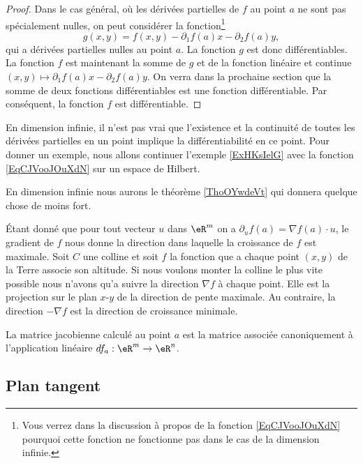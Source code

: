 \begin{proof}
Dans le cas général, où les dérivées partielles de $f$ au point $a$ ne sont pas spécialement nulles, on peut considérer la fonction\footnote{Vous verrez dans la discussion à propos de la fonction \eqref{EqCJVooJOuXdN} pourquoi cette fonction ne fonctionne pas dans le cas de la dimension infinie.}
\begin{equation}    \label{EqXHVooJeQKrB}    
    g(x,y)=f(x,y)-\partial_1 f(a)x-\partial_2 f(a)y,
\end{equation}
qui a dérivées partielles nulles au point $a$. La fonction $g$ est donc différentiables. La fonction $f$ est maintenant la somme de $g$ et de la fonction linéaire et continue $(x,y)\mapsto \partial_1 f(a)x-\partial_2 f(a)y$. On verra dans la prochaine section que la somme de deux fonctions différentiables est une fonction différentiable. Par conséquent, la fonction $f$ est différentiable.
\end{proof}

\begin{remark}
    En dimension infinie, il n'est pas vrai que l'existence et la continuité de toutes les dérivées partielles en un point implique la différentiabilité en ce point. Pour donner un exemple, nous allons continuer l'exemple \ref{ExHKsIelG}
    avec la fonction \ref{EqCJVooJOuXdN} sur un espace de Hilbert.

    En dimension infinie nous aurons le théorème \ref{ThoOYwdeVt} qui donnera quelque chose de moins fort.
\end{remark}

Étant donné que pour tout vecteur $u$ dans $\eR^m$ on a $\partial_uf(a)=\nabla f(a)\cdot u$, le gradient de $f$ nous donne la direction dans laquelle la croissance de $f$ est maximale. Soit $C$ une colline et soit $f$ la fonction que a chaque point $(x,y)$ de la Terre associe son altitude. Si nous voulons monter la colline le plus vite possible nous n'avons qu'a suivre la direction $\nabla f$ à chaque point. Elle est la projection sur le plan $x$-$y$ de la direction de pente maximale. Au contraire, la direction $-\nabla f$ est la direction de croissance minimale.
   
La matrice jacobienne calculé au point $a$ est la matrice associée canoniquement à l'application linéaire $df_a:\eR^m\to\eR^n$.

\subsection{Plan tangent}

